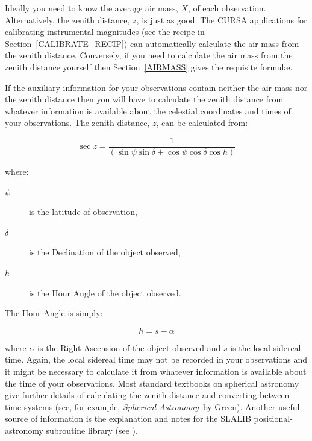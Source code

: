 \documentclass[twoside,11pt,nolof]{starlink}
\begin{document}
Ideally you need to know the average air mass, $X$, of each observation.
Alternatively, the zenith distance, $z$, is just as good.  The CURSA
applications for calibrating instrumental magnitudes (see the recipe in
Section~\ref{CALIBRATE_RECIP}) can automatically calculate the air mass
from the zenith distance.  Conversely, if you need to calculate the air
mass from the zenith distance yourself then Section~\ref{AIRMASS} gives
the requisite formul\ae.

If the auxiliary information for your observations contain neither the
air mass nor the zenith distance then you will have to calculate the
zenith distance from whatever information is available about the
celestial coordinates and times of your observations.  The zenith
distance, $z$, can be calculated from:

\begin{equation}
\sec z = \frac{1}{(\sin \psi \sin \delta + \cos \psi \cos \delta \cos
h)}
\end{equation}

where:

\begin{description}

  \item[$\psi$] is the latitude of observation,

  \item[$\delta$] is the Declination of the object observed,

  \item[$h$] is the Hour Angle of the object observed.

\end{description}

The Hour Angle is simply:

\begin{equation}
h = s - \alpha
\end{equation}

where $\alpha$ is the Right Ascension of the object observed and $s$
is the local sidereal time.  Again, the local sidereal time may not
be recorded in your observations and it might be necessary to calculate
it from whatever information is available about the time of your
observations.  Most standard textbooks on spherical astronomy give
further details of calculating the zenith distance and converting
between time systems (see, for example, \textit{Spherical Astronomy}\, by
Green\cite{GREEN85}).  Another useful source of information is the
explanation and notes for the SLALIB positional-astronomy subroutine
library (see \cite{SUN67}).
\end{document}
